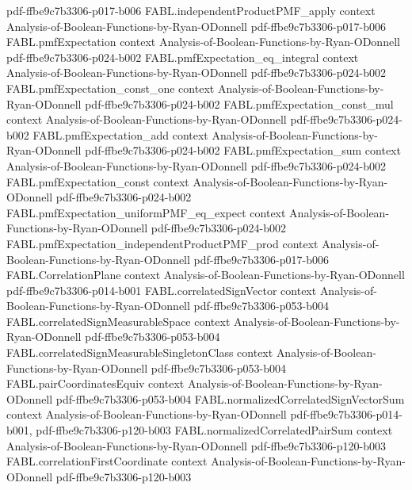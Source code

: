 \begin{theorem}
  {pdf-ffbe9c7b3306-p017-b006}
\proofstep
  {FABL.independentProductPMF_apply}
  {context}
  {Analysis-of-Boolean-Functions-by-Ryan-ODonnell}
  {pdf-ffbe9c7b3306-p017-b006}
\proofstep
  {FABL.pmfExpectation}
  {context}
  {Analysis-of-Boolean-Functions-by-Ryan-ODonnell}
  {pdf-ffbe9c7b3306-p024-b002}
\proofstep
  {FABL.pmfExpectation_eq_integral}
  {context}
  {Analysis-of-Boolean-Functions-by-Ryan-ODonnell}
  {pdf-ffbe9c7b3306-p024-b002}
\proofstep
  {FABL.pmfExpectation_const_one}
  {context}
  {Analysis-of-Boolean-Functions-by-Ryan-ODonnell}
  {pdf-ffbe9c7b3306-p024-b002}
\proofstep
  {FABL.pmfExpectation_const_mul}
  {context}
  {Analysis-of-Boolean-Functions-by-Ryan-ODonnell}
  {pdf-ffbe9c7b3306-p024-b002}
\proofstep
  {FABL.pmfExpectation_add}
  {context}
  {Analysis-of-Boolean-Functions-by-Ryan-ODonnell}
  {pdf-ffbe9c7b3306-p024-b002}
\proofstep
  {FABL.pmfExpectation_sum}
  {context}
  {Analysis-of-Boolean-Functions-by-Ryan-ODonnell}
  {pdf-ffbe9c7b3306-p024-b002}
\proofstep
  {FABL.pmfExpectation_const}
  {context}
  {Analysis-of-Boolean-Functions-by-Ryan-ODonnell}
  {pdf-ffbe9c7b3306-p024-b002}
\proofstep
  {FABL.pmfExpectation_uniformPMF_eq_expect}
  {context}
  {Analysis-of-Boolean-Functions-by-Ryan-ODonnell}
  {pdf-ffbe9c7b3306-p024-b002}
\proofstep
  {FABL.pmfExpectation_independentProductPMF_prod}
  {context}
  {Analysis-of-Boolean-Functions-by-Ryan-ODonnell}
  {pdf-ffbe9c7b3306-p017-b006}
\proofstep
  {FABL.CorrelationPlane}
  {context}
  {Analysis-of-Boolean-Functions-by-Ryan-ODonnell}
  {pdf-ffbe9c7b3306-p014-b001}
\proofstep
  {FABL.correlatedSignVector}
  {context}
  {Analysis-of-Boolean-Functions-by-Ryan-ODonnell}
  {pdf-ffbe9c7b3306-p053-b004}
\proofstep
  {FABL.correlatedSignMeasurableSpace}
  {context}
  {Analysis-of-Boolean-Functions-by-Ryan-ODonnell}
  {pdf-ffbe9c7b3306-p053-b004}
\proofstep
  {FABL.correlatedSignMeasurableSingletonClass}
  {context}
  {Analysis-of-Boolean-Functions-by-Ryan-ODonnell}
  {pdf-ffbe9c7b3306-p053-b004}
\proofstep
  {FABL.pairCoordinatesEquiv}
  {context}
  {Analysis-of-Boolean-Functions-by-Ryan-ODonnell}
  {pdf-ffbe9c7b3306-p053-b004}
\proofstep
  {FABL.normalizedCorrelatedSignVectorSum}
  {context}
  {Analysis-of-Boolean-Functions-by-Ryan-ODonnell}
  {pdf-ffbe9c7b3306-p014-b001,
    pdf-ffbe9c7b3306-p120-b003}
\proofstep
  {FABL.normalizedCorrelatedPairSum}
  {context}
  {Analysis-of-Boolean-Functions-by-Ryan-ODonnell}
  {pdf-ffbe9c7b3306-p120-b003}
\proofstep
  {FABL.correlationFirstCoordinate}
  {context}
  {Analysis-of-Boolean-Functions-by-Ryan-ODonnell}
  {pdf-ffbe9c7b3306-p120-b003}
\proofstep

\end{theorem}
